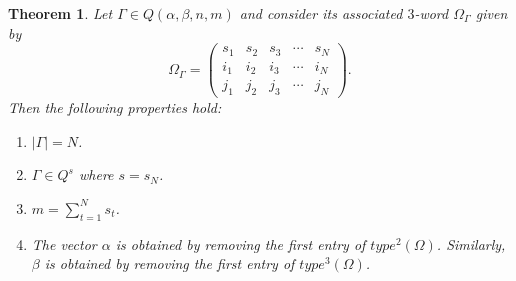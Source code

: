 \documentclass[11pt]{article}
\newtheorem{thm}{Theorem}%
\begin{document}
\begin{thm}
Let $\Gamma \in Q(\alpha, \beta, n, m)$ and consider its associated $3$-word $\Omega_{\Gamma}$ given by
\[
\Omega_{\Gamma} = \begin{pmatrix}
s_1 & s_2 & s_3 & \cdots & s_{N} \\
i_1 & i_2 & i_3 & \cdots & i_{N} \\
j_1 & j_2 & j_3 & \cdots & j_{N}
\end{pmatrix}.
\]
Then the following properties hold:
\begin{enumerate}
    \item $|\Gamma| = N$.
    \item $\Gamma \in Q^{s}$ where $s = s_{N}$.
    \item $m = \displaystyle\sum_{t=1}^{N} s_{t}$.
    \item The vector $\alpha$ is obtained by removing the first entry of $type^{2}(\Omega)$. Similarly, $\beta$ is obtained by removing the first entry of $type^{3}(\Omega)$.
\end{enumerate}
\end{thm}
\end{document}
